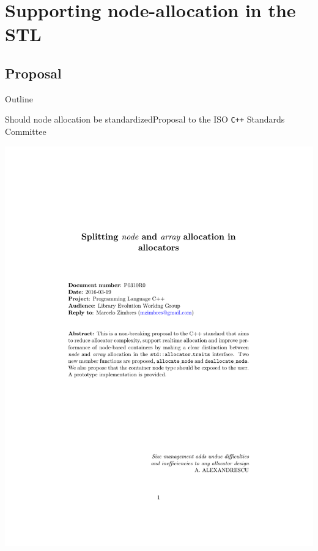 \documentclass[10pt,aspectratio=169]{beamer}
\begin{document}
\section{Supporting node-allocation in the STL}
\subsection{Proposal}

\begin{frame}{Outline}
\end{frame}

\begin{frame}{Should node allocation be standardized}{Proposal to the ISO \texttt{C++} Standards Committee}
\vspace{-3cm}
    \begin{center}
        \includegraphics[scale=0.6]{fig/prop1.pdf} \\
    \end{center}
\end{frame}
\end{document}
